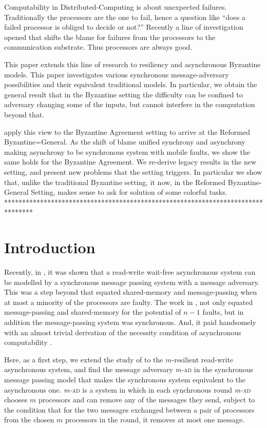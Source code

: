 \documentclass[11pt]{article}
\newcommand{\mAD}{{\textit{m-}\textsc{ad}}\xspace}
\begin{document}
{Computability in Distributed-Computing is about unexpected failures.
Traditionally the processors are the one to fail,
hence a question like ``does a failed processor is obliged to decide or not?''
Recently a line of investigation opened that shifts the blame for failures
from the processors to the communication substrate.
Thus processors are always good.

This paper extends this line of research to resiliency and asynchronous Byzantine models.
This paper investigates various synchronous message-adversary possibilities and their equivalent
traditional models. In particular, we obtain the general result that in the Byzantine setting
the difficulty can be confined to adversary changing some of the inputs, but cannot
interfere in the computation beyond that.


 apply this view to the Byzantine Agreement setting to arrive at the Reformed Byzantine=General.
As the shift of blame unified synchrony and asynchrony making asynchrony to 
be synchronous system with mobile faults, we show the same holds for the Byzantine
Agreement. We re-derive legacy results in the new setting, and present new problems
that the setting triggers. In particular we show that, unlike the traditional Byzantine setting, it now,
in the Reformed Byzantine-General Setting, makes sense to ask
for solution of some colorful tasks.
********************************************************************************
}

\section{Introduction}
Recently, in \cite{AG15}, it was shown that a read-write wait-free asynchronous system can be modelled by a synchronous
message passing system
with a message adversary. This was a step beyond \cite{ABD90,ABD95} that equated shared-memory and message-passing when at most a minority of the
processors are faulty. The work in \cite{AG15}, 
not only equated message-passing and shared-memory for the potential of $n-1$ faults,
but in addition the message-passing system was synchronous. And, it paid handsomely with an almost trivial derivation of the 
necessity condition of asynchronous computability \cite{HS}.

Here, as a first step, we extend the study of \cite{AG15} to the $m$-resilient read-write asynchronous system,
and find the message adversary \mAD in the synchronous message passing model that makes the synchronous system equivalent to the asynchronous one.
\mAD is a system in which in each synchronous round \mAD chooses $m$ processors and can remove any of the messages they send, subject to the condition that for the two messages exchanged
between a pair of processors from the chosen $m$ processors in the round, it removes at most one message.
\end{document}
